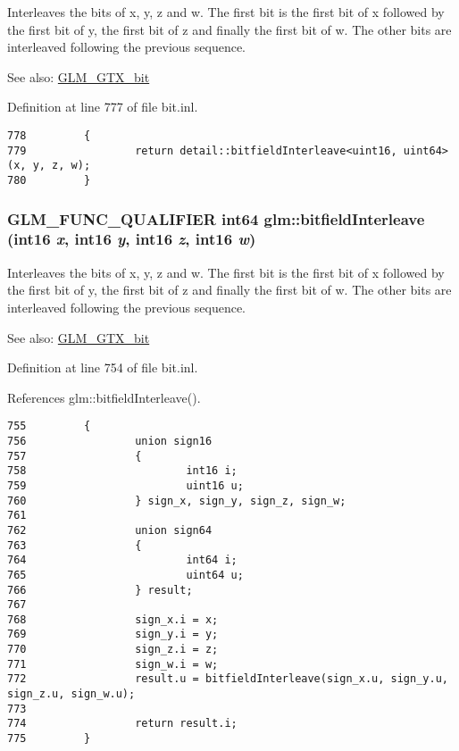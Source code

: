 Interleaves the bits of x, y, z and w. The first bit is the first bit of x followed by the first bit of y, the first bit of z and finally the first bit of w. The other bits are interleaved following the previous sequence.

\begin{Desc}
\item[See also:]\hyperlink{group__gtx__bit}{GLM\_\-GTX\_\-bit} \end{Desc}


Definition at line 777 of file bit.inl.

\begin{Code}\begin{verbatim}778         {
779                 return detail::bitfieldInterleave<uint16, uint64>(x, y, z, w);
780         }
\end{verbatim}
\end{Code}


\hypertarget{group__gtx__bit_g09ee0be0fac790a1607a711e597dd9bf}{
\subsubsection[bitfieldInterleave]{\setlength{\rightskip}{0pt plus 5cm}GLM\_\-FUNC\_\-QUALIFIER int64 glm::bitfieldInterleave (int16 {\em x}, \/  int16 {\em y}, \/  int16 {\em z}, \/  int16 {\em w})}}
\label{group__gtx__bit_g09ee0be0fac790a1607a711e597dd9bf}


Interleaves the bits of x, y, z and w. The first bit is the first bit of x followed by the first bit of y, the first bit of z and finally the first bit of w. The other bits are interleaved following the previous sequence.

\begin{Desc}
\item[See also:]\hyperlink{group__gtx__bit}{GLM\_\-GTX\_\-bit} \end{Desc}


Definition at line 754 of file bit.inl.

References glm::bitfieldInterleave().

\begin{Code}\begin{verbatim}755         {
756                 union sign16
757                 {
758                         int16 i;
759                         uint16 u;
760                 } sign_x, sign_y, sign_z, sign_w;
761 
762                 union sign64
763                 {
764                         int64 i;
765                         uint64 u;
766                 } result;
767 
768                 sign_x.i = x;
769                 sign_y.i = y;
770                 sign_z.i = z;
771                 sign_w.i = w;
772                 result.u = bitfieldInterleave(sign_x.u, sign_y.u, sign_z.u, sign_w.u);
773 
774                 return result.i;
775         }
\end{verbatim}
\end{Code}




